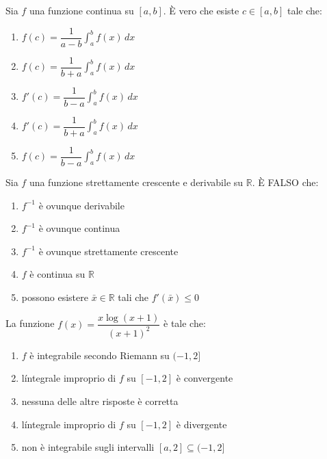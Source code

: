 \begin{quiz}
Sia $f$ una funzione continua su $[a,b]$. \`E vero che esiste $c\in[a,b]$ tale che:
\begin{enumerate}
\item $f(c)=\dfrac1{a-b}\int_a^b f(x)\,dx$
\item $f(c)=\dfrac1{b+a}\int_a^b f(x)\,dx$
\item $f\prime(c)=\dfrac1{b-a}\int_a^b f(x)\,dx$
\item $f\prime(c)=\dfrac1{b+a}\int_a^b f(x)\,dx$
\item $f(c)=\dfrac1{b-a}\int_a^b f(x)\,dx$
\end{enumerate}
\end{quiz}

\begin{quiz}
Sia $f$ una funzione strettamente crescente e derivabile su $\mathbb R$. \`E FALSO che:
\begin{enumerate}
\item $f^{-1}$ \`e ovunque derivabile
\item $f^{-1}$ \`e ovunque continua
\item $f^{-1}$ \`e ovunque strettamente crescente
\item $f$ \`e continua su $\mathbb R$
\item possono esistere $\bar x\in\mathbb R$ tali che $f\prime(\bar x)\le0$
\end{enumerate}
\end{quiz}

\begin{quiz}
La funzione $f(x)=\dfrac{x\log(x+1)}{(x+1)^2}$ \`e tale che:
\begin{enumerate}
\item $f$ \`e integrabile secondo Riemann su $(-1,2]$
\item l\'integrale improprio di $f$ su $[-1,2]$ \`e convergente
\item nessuna delle altre risposte \`e corretta
\item l\'integrale improprio di $f$ su $[-1,2]$ \`e divergente
\item non \`e integrabile sugli intervalli $[a,2]\subseteq(-1,2]$
\end{enumerate}
\end{quiz}

